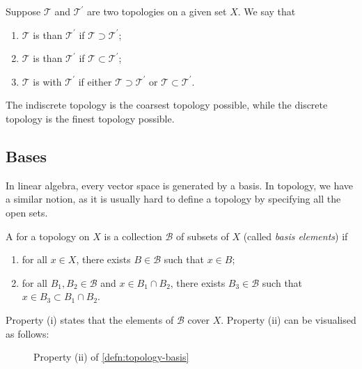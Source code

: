 \begin{definition}
Suppose $\mathcal{T}$ and $\mathcal{T}^\prime$ are two topologies on a given set $X$. We say that
\begin{enumerate}[label=(\roman*)]
\item $\mathcal{T}$ is  than $\mathcal{T}^\prime$ if $\mathcal{T}\supset\mathcal{T}^\prime$;
\item $\mathcal{T}$ is  than $\mathcal{T}^\prime$ if $\mathcal{T}\subset\mathcal{T}^\prime$;
\item $\mathcal{T}$ is  with $\mathcal{T}^\prime$ if either $\mathcal{T}\supset\mathcal{T}^\prime$ or $\mathcal{T}\subset\mathcal{T}^\prime$.
\end{enumerate}
\end{definition}

\begin{example}
The indiscrete topology is the coarsest topology possible, while the discrete topology is the finest topology possible.
\end{example}
\pagebreak

\subsection{Bases}
In linear algebra, every vector space is generated by a basis. In topology, we have a similar notion, as it is usually hard to define a topology by specifying all the open sets.

\begin{definition}[Basis]\label{defn:topology-basis}
A  for a topology on $X$ is a collection $\mathcal{B}$ of subsets of $X$ (called \emph{basis elements}) if
\begin{enumerate}[label=(\roman*)]
\item for all $x\in X$, there exists $B\in\mathcal{B}$ such that $x\in B$;
\item for all $B_1,B_2\in\mathcal{B}$ and $x\in B_1\cap B_2$, there exists $B_3\in\mathcal{B}$ such that $x\in B_3\subset B_1\cap B_2$.
\end{enumerate}
\end{definition}

Property (i) states that the elements of $\mathcal{B}$ cover $X$. Property (ii) can be visualised as follows:

\begin{figure}[H]
\centering
{}
\caption{Property (ii) of \cref{defn:topology-basis}}
\end{figure}

